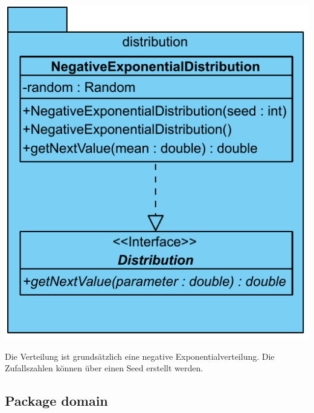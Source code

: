\includegraphics[scale=0.5]{abbildungen/uml/distribution.pdf}

Die Verteilung ist grundsätzlich eine negative Exponentialverteilung. Die
Zufallszahlen können über einen Seed erstellt werden.

\subsection{Package domain}

